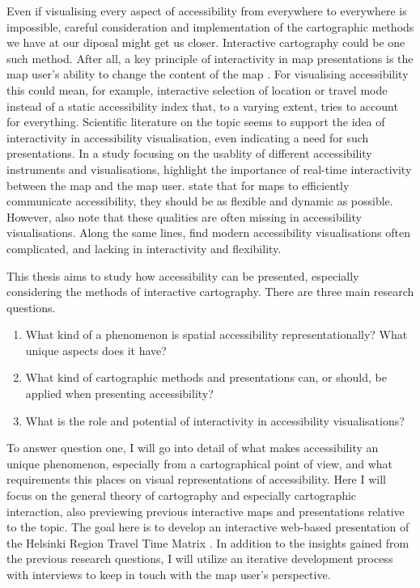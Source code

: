 Even if visualising every aspect of accessibility
from everywhere to everywhere is impossible,
careful consideration and implementation of
the cartographic methods we have at our diposal
might get us closer.
Interactive cartography could be one such method.
After all, a key principle of interactivity in map presentations is
the map user's ability to change the content of the map \parencite{rot2013b}.
For visualising accessibility this could mean, for example,
interactive selection of location or travel mode instead of
a static accessibility index that, to a varying extent,
tries to account for everything.
Scientific literature on the topic seems to support the idea of
interactivity in accessibility visualisation,
even indicating a need for such presentations.
In a study focusing on the usablity of
different accessibility instruments and visualisations,  %
\textcite{te2014} highlight the importance of
real-time interactivity between the map and the map user.
\textcite{but2018} state that for maps to efficiently communicate accessibility,
they should be as flexible and dynamic as possible.
However, \textcite{but2018} also note that
these qualities are often missing in accessibility visualisations.
Along the same lines, \textcite{paj2021} find modern accessibility visualisations often complicated,
and lacking in interactivity and flexibility.

This thesis aims to study how accessibility can be presented,
especially considering the methods of interactive cartography.
There are three main research questions.

\begin{enumerate}
	\item What kind of a phenomenon is spatial accessibility representationally?
	What unique aspects does it have?
	\item What kind of cartographic methods and presentations can, or should, 
	be applied when presenting accessibility?
	\item What is the role and potential of interactivity in accessibility visualisations?
\end{enumerate}

To answer question one, I will go into detail of what makes accessibility an unique phenomenon,
especially from a cartographical point of view,
and what requirements this places on visual representations of accessibility.
Here I will focus on the general theory of cartography and especially cartographic interaction,
also previewing previous interactive maps and presentations relative to the topic.
The goal here is to develop an interactive web-based presentation of the
Helsinki Region Travel Time Matrix \parencite{ten2020}.
In addition to the insights gained from the previous research questions,
I will utilize an iterative development process with interviews
to keep in touch with the map user's perspective.

